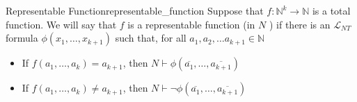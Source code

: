 \begin{definition}{Representable Function}{representable_function}
    Suppose that $f: \mathbb{N}^{k} \rightarrow \mathbb{N}$ is a total function. We will say that $f$ is a representable function (in $N$ ) if there is an $\mathcal{L}_{N T}$ formula $\phi\left(x_{1}, \ldots, x_{k+1}\right)$ such that, for all $a_{1}, a_{2}, \ldots a_{k+1} \in \mathbb{N}$
    \begin{itemize}
        \item If $f\left(a_{1}, \ldots, a_{k}\right)=a_{k+1}$, then $N \vdash \phi\left(\overline{a_{1}}, \ldots, \overline{a_{k+1}}\right)$
        \item If $f\left(a_{1}, \ldots, a_{k}\right) \neq a_{k+1}$, then $N \vdash \neg \phi\left(\overline{a_{1}}, \ldots, \overline{a_{k+1}}\right)$
    \end{itemize}
\end{definition}
